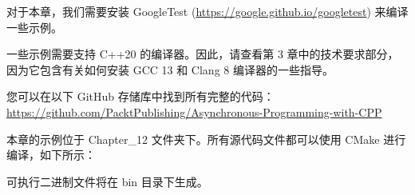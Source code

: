 对于本章，我们需要安装 GoogleTest (\url{https://google.github.io/googletest}) 来编译一些示例。

一些示例需要支持 C++20 的编译器。因此，请查看第 3 章中的技术要求部分，因为它包含有关如何安装 GCC 13 和 Clang 8 编译器的一些指导。

您可以在以下 GitHub 存储库中找到所有完整的代码： \url{https://github.com/PacktPublishing/Asynchronous-Programming-with-CPP}

本章的示例位于 Chapter\_12 文件夹下。所有源代码文件都可以使用 CMake 进行编译，如下所示：


可执行二进制文件将在 bin 目录下生成。
